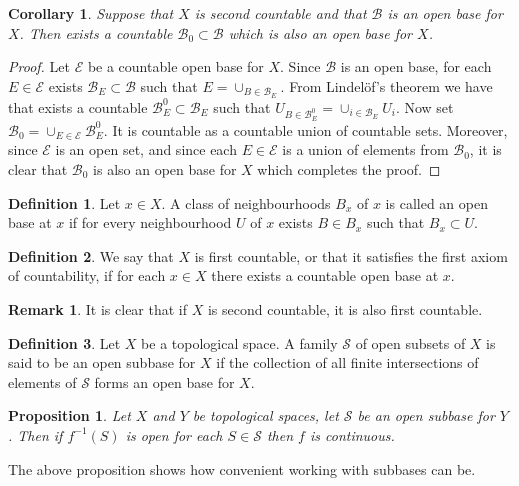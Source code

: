 \documentclass[11pt,a4paper]{article}
\theoremstyle{definition}
\newtheorem{definition}{Definition}[section]
\newtheorem{remark}{Remark}[section]
\theoremstyle{plain}
\newtheorem{proposition}[theorem]{Proposition}
\newtheorem{corollary}[theorem]{Corollary}
\begin{document}
	\begin{corollary}
		Suppose that $X$ is second countable and that $\mathcal{B}$ is an open
		base for $X$. Then exists a countable $\mathcal{B}_0 \subset \mathcal{B}$ 
		which is also an open base for $X$.
	\end{corollary}
	\begin{proof}
		Let $\mathcal{E}$ be a countable open base for $X$. Since $\mathcal{B}$
		is an open base, for each $E \in \mathcal{E}$ exists 
		$\mathcal{B}_E \subset \mathcal{B}$ such that 
		$E = \cup_{B \in \mathcal{B}_E}$. From Lindel\"of's theorem
		we have that exists a countable $\mathcal{B}^0_E \subset \mathcal{B}_E$
		such that $U_{B \in \mathcal{B}^0_E} = \cup_{i \in \mathcal{B}_E}{U_i}$.
		Now set $\mathcal{B}_0 = \cup_{E \in \mathcal{E}}{\mathcal{B}^0_E}$.
		It is countable as a countable union of countable sets. Moreover,
		since $\mathcal{E}$ is an open set, and since each $E \in \mathcal{E}$
		is a union of elements from $\mathcal{B}_0$, it is clear that
		$\mathcal{B}_0$ is also an open base for $X$ which completes the proof.
	\end{proof}
	\begin{definition}
		Let $x \in X$. A class of neighbourhoods $B_x$ of $x$ is called an open
		base at $x$ if for every neighbourhood $U$ of $x$ exists $B \in B_x$
		such that $B_x \subset U$.
	\end{definition}
	\begin{definition}
		We say that $X$ is first countable, or that it satisfies the first
		axiom of countability, if for each $x \in X$ there exists a countable 
		open base at $x$.
	\end{definition}
	\begin{remark}
		It is clear that if $X$ is second countable, it is also first countable.
	\end{remark}
	\begin{definition}
		Let $X$ be a topological space. A family $\mathcal{S}$ of open subsets 
		of $X$ is said to be an open subbase for $X$ if the collection of all 
		finite intersections of elements of $\mathcal{S}$ forms an open base 
		for $X$.
	\end{definition}
	\begin{proposition}
		Let $X$ and $Y$ be topological spaces, let $\mathcal{S}$ be an open
		subbase for $Y$. Then if $f^{-1}(S)$ is open for each $S \in \mathcal{S}$
		then $f$ is continuous.
	\end{proposition}
	The above proposition shows how convenient working with subbases can be.
\end{document}
